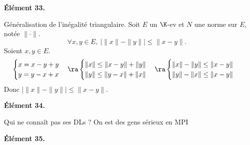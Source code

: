 \documentclass[11pt]{article}
\begin{document}
\pagebreak

\bf{Élément 33.}

\begin{prop}{Généralisation de l'inégalité triangulaire.}{}
    Soit $E$ un $\K$-ev et $N$ une norme sur $E$, notée $\|\cdot\|$.
    \begin{equation*}
        \forall x,y \in E, ~ |\|x\|-\|y\||\leq\|x-y\|.
    \end{equation*}
    \tcblower
    Soient $x,y\in E$.
    \begin{equation*}
        \begin{cases}
            x=x-y+y\\
            y=y-x+x
        \end{cases} \ra \begin{cases}
            \|x\|\leq\|x-y\|+\|y\|\\
            \|y\|\leq\|y-x\|+\|x\|
        \end{cases} \ra \begin{cases}
            \|x\|-\|y\| \leq \|x-y\|\\
            \|y\|-\|x\| \leq \|x-y\|
        \end{cases}
    \end{equation*}
    Donc $|\|x\|-\|y\|| \leq \|x-y\|$.
\end{prop}

\vspace*{-0.4cm}

\bf{Élément 34.}

Qui ne connaît pas ses DLs ? On est des gens sérieux en MPI

\bf{Élément 35.}
\end{document}
